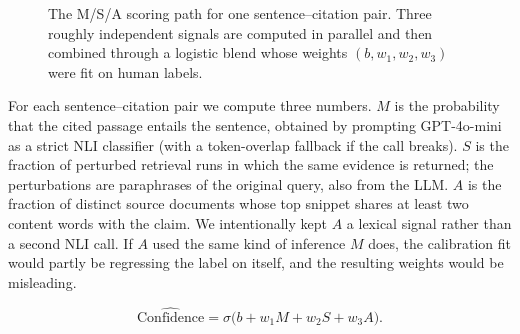 \documentclass[10pt]{article}
\begin{document}
\begin{figure}[t]
\centering
{}
\caption{The M/S/A scoring path for one sentence--citation pair.
Three roughly independent signals are computed in parallel and then
combined through a logistic blend whose weights $(b, w_1, w_2, w_3)$
were fit on human labels.}
\label{fig:msa_pipeline}
\end{figure}

For each sentence--citation pair we compute three numbers. $M$ is the
probability that the cited passage entails the sentence, obtained by
prompting GPT-4o-mini as a strict NLI classifier (with a token-overlap
fallback if the call breaks). $S$ is the fraction of perturbed
retrieval runs in which the same evidence is returned; the
perturbations are paraphrases of the original query, also from the
LLM. $A$ is the fraction of distinct source documents whose top
snippet shares at least two content words with the claim. We
intentionally kept $A$ a lexical signal rather than a second NLI
call. If $A$ used the same kind of inference $M$ does, the
calibration fit would partly be regressing the label on itself, and
the resulting weights would be misleading.

\begin{equation}
\widehat{\text{Confidence}}
= \sigma\!\bigl(b + w_1 M + w_2 S + w_3 A\bigr).
\label{eq:msa}
\end{equation}
\end{document}
